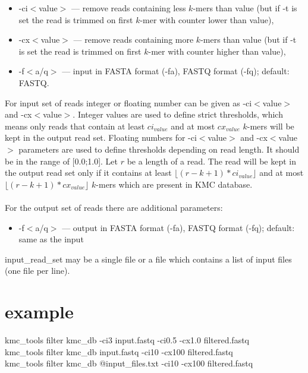 \begin{itemize}
	\item \textsf{-ci$<$value$>$} --- remove reads containing less $k$-mers than value (but if -t is set the read is trimmed on first $k$-mer with counter lower than value),
	\item \textsf{-cx$<$value$>$} --- remove reads containing more $k$-mers than value (but if -t is set the read is trimmed on first $k$-mer with counter higher than value),
	\item \textsf{-f$<$a/q$>$} --- input in FASTA format (-fa), FASTQ format (-fq); default: FASTQ.
\end{itemize}
For input set of reads integer or floating number can be given as \textsf{-ci$<$value$>$} and \textsf{-cx$<$value$>$}. Integer values are used to define strict thresholds, which means only reads that contain at least $ci_{value}$ and at most $cx_{value}$ $k$-mers will be kept in the output read set.
Floating numbers for \textsf{-ci$<$value$>$} and \textsf{-cx$<$value$>$} parameters are used to define thresholds depending on read length. It should be in the range of [0.0;1.0]. Let $r$ be a length of a read. The read will be kept in the output read set only if it contains at least $\lfloor (r-k+1) * ci_{value} \rfloor$ and at most $\lfloor (r-k+1) * cx_{value} \rfloor$ $k$-mers which are present in \textsf{KMC} database. \\ \\
For the output set of reads there are additional parameters:
\begin{itemize}
	\item \textsf{-f$<$a/q$>$} --- output in FASTA format (-fa), FASTQ format (-fq); default: same as the input
\end{itemize}
\textsf{input\_read\_set} may be a single file or a file which contains a list of input files (one file per line). 

\section*{example}
 kmc\_tools filter kmc\_db -ci3 input.fastq -ci0.5 -cx1.0 filtered.fastq \\
 kmc\_tools filter kmc\_db input.fastq -ci10 -cx100 filtered.fastq \\
 kmc\_tools filter kmc\_db @input\_files.txt -ci10 -cx100 filtered.fastq